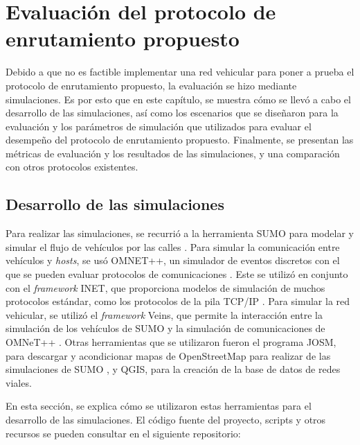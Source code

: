 ﻿\chapter{Evaluación del protocolo de enrutamiento propuesto}
\label{ch:evaluacion_del_protocolo_de_enrutamiento_propuesto}

Debido a que no es factible implementar una red vehicular para poner a prueba el
protocolo de enrutamiento propuesto, la evaluación se hizo mediante
simulaciones. Es por esto que en este capítulo, se muestra cómo se llevó a cabo
el desarrollo de las simulaciones, así como los escenarios que se diseñaron para
la evaluación y los parámetros de simulación que utilizados para evaluar el
desempeño del protocolo de enrutamiento propuesto. Finalmente, se presentan las
métricas de evaluación y los resultados de las simulaciones, y una comparación
con otros protocolos existentes.

\section{Desarrollo de las simulaciones}
\label{sec:desarrollo_de_las_simulaciones}

Para realizar las simulaciones, se recurrió a la herramienta SUMO para modelar y
simular el flujo de vehículos por las calles \cite{SUMO}. Para simular la
comunicación entre vehículos y \textit{hosts}, se usó OMNET++, un simulador de
eventos discretos con el que se pueden evaluar protocolos de comunicaciones
\cite{OMNeT}. Este se utilizó en conjunto con el \textit{framework} INET, que
proporciona modelos de simulación de muchos protocolos estándar, como los
protocolos de la pila TCP/IP \cite{INET}. Para simular la red vehicular, se
utilizó el \textit{framework} Veins, que permite la interacción entre la
simulación de los vehículos de SUMO y la simulación de comunicaciones de OMNeT++
\cite{Veins}. Otras herramientas que se utilizaron fueron el programa JOSM, para
descargar y acondicionar mapas de OpenStreetMap para realizar de las
simulaciones de SUMO \cite{OpenStreetMap} \cite{JOSM}, y QGIS, para la creación
de la base de datos de redes viales.

En esta sección, se explica cómo se utilizaron estas herramientas para el
desarrollo de las simulaciones. El código fuente del proyecto, scripts y otros
recursos se pueden consultar en el siguiente repositorio:


